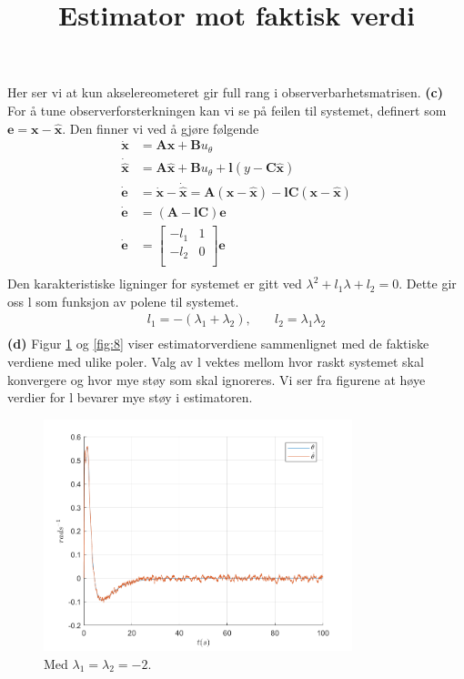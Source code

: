 \documentclass[11pt, a4paper, norsk]{rapport1} %
\begin{document}
Her ser vi at kun akselereometeret gir full rang i observerbarhetsmatrisen.
\newline
\textbf{(c)}
For å tune observerforsterkningen kan vi se på feilen til systemet, definert som $\mathbf{e} = \mathbf{x}-\mathbf{\hat{x}}$. Den finner vi ved å gjøre følgende
\begin{equation}
    \begin{aligned}
        \mathbf{\dot{x}} &= \mathbf{Ax} + \mathbf{B}u_{\theta} \\
        \mathbf{\dot{\hat{x}}} &= \mathbf{A}\hat{\mathbf{x}} + \mathbf{B}u_{\theta} + \mathbf{l}(y - \mathbf{C}\hat{\mathbf{x}}) \\
        \mathbf{\dot{e}} &= \mathbf{\dot{x}} - \mathbf{\dot{\hat{x}}} = \mathbf{A}(\mathbf{x} - \hat{\mathbf{x}}) - \mathbf{lC}(\mathbf{x} - \hat{\mathbf{x}}) \\
        \mathbf{\dot{e}} &= (\mathbf{A} - \mathbf{lC})\mathbf{e} \\
        \mathbf{\dot{e}} &=
        \begin{bmatrix}
            -l_1 & 1 \\
            -l_2 & 0 \\
        \end{bmatrix}\mathbf{e} \\
    \end{aligned}
\end{equation}
Den karakteristiske ligninger for systemet er gitt ved $\lambda^2 + l_1\lambda + l_2 = 0$. Dette gir oss l som funksjon av polene til systemet.
\begin{equation}
    \begin{aligned}
        l_1 = -(\lambda_1+\lambda_2), &\quad l_2 = \lambda_1\lambda_2 \\
    \end{aligned}
\end{equation}
\textbf{(d)} Figur \ref{fig:7} og \ref{fig:8} viser estimatorverdiene sammenlignet med de faktiske verdiene med ulike poler.
Valg av l vektes mellom hvor raskt systemet skal konvergere og hvor mye støy som skal ignoreres. Vi ser fra figurene at høye verdier for l bevarer mye støy i estimatoren.
\begin{figure}
    \centering
    \title{\textbf{Estimator mot faktisk verdi}}
    \includegraphics[width=0.8\textwidth]{figures/oppg4_estimator.png}
    \caption{Med $\lambda_1 = \lambda_2 = -2$.}
    \label{fig:7}
\end{figure}
\end{document}
